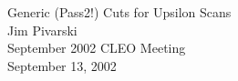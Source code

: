

\def\ys{$\Upsilon(1S)$}
\def\yss{$\Upsilon(2S)$}
\def\ysss{$\Upsilon(3S)$}
\def\gamee{$\Gamma_{e^+e^-}$}

\newcommand{\talktitle}[0]{\gamee for \ys, \yss\  and \ysss}
\newcommand{\fmttitle}[0]{}
\newcommand{\conftitle}[0]{September 2002 CLEO Meeting}
\newcommand{\myname}[0]{Jim Pivarski}
\newcommand{\affila}[0]{Cornell University}
\newcommand{\talkdate}[0]{September 13, 2002}

\pagestyle{conference}   %




\slideheight 7.0in
\slidewidth 8.8in 

\renewcommand{\arraystretch}{0.3}
\renewcommand{\slidetopmargin}{0.4in}
\renewcommand{\slidebottommargin}{0.9in}



\begin{slide*}

\slideframe{}

\begin{center}
\vspace{4 cm}
{\Huge \black Generic (Pass2!) Cuts for Upsilon Scans } \\
{\LARGE \black	Jim Pivarski } \\
\vspace{2 cm}
\conftitle \\
{\large \black \talkdate}

\end{center}

\end{slide*}



